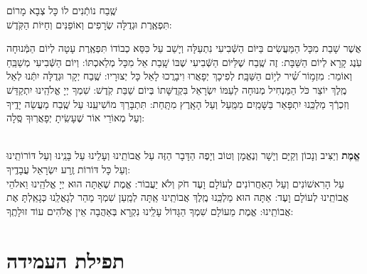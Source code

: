 \documentclass[twoside, openany, parskip=half, 11pt]{book}
\begin{document}
\shatz  שֶֽׁבַח נוֹתְֿנִים לוֹ כָּל צְבָא מָרוֹם \\
תִּפְאֶֽרֶת וּגְדֻלָּה שְׂרָפִים וְאוֹפַנִּים וְחַיּוֹת הַקֹּֽדֶשׁ:

 אֲשֶׁר שָׁבַת מִכָּל הַמַּעֲשִׂים בַּיּוֹם הַשְּֿׁבִיעִי נִתְעַלָּה וְיָשַׁב עַל כִּסֵּא כְבוֹדוֹ תִּפְאֶֽרֶת עָטָה לְיוֹם הַמְּֿנוּחָה עֹֽנֶג קָרָא לְיוֹם הַשַּׁבָּת: זֶה שֶֽׁבַח שֶׁלַּיּוֹם הַשְּֿׁבִיעִי שֶׁבּוֹ שָֽׁבַת אֵל מִכָּל מְלַאכְתּוֹ: וְיוֹם הַשְּֿׁבִיעִי מְשַׁבֵּֽחַ וְאוֹמֵר:
 מִזְמ֥וֹר שִׁ֝֗יר לְי֥וֹם הַשַּׁבָּֽת׃ לְפִיכָךְ יְפָאֲרוּ וִיבָרֲכוּ לָאֵל כָּל יְצוּרָיו: שֶֽׁבַח יְקָר וּגְדֻלָּה יִתְּֿנוּ לְאֵל מֶֽלֶךְ יוֹצֵר כֹּל הַמַּנְחִיל מְנוּחָה לְעַמּוֹ יִשְׂרָאֵל בִּקְדֻשָּׁתוֹ בְּיוֹם שַׁבַּת קֹֽדֶשׁ: שִׁמְךָ יְיָ אֱלֹהֵֽינוּ יִתְקַדַּשׁ וְזִכְרְֿךָ מַלְכֵּֽנוּ יִתְפָּאַר בַּשָּׁמַֽיִם מִמַּֽעַל וְעַל הָאָֽרֶץ מִתָּֽחַת:
  תִּתְבָּרַךְ מוֹשִׁיעֵֽנוּ עַל שֶֽׁבַח מַעֲשֵׂה יָדֶֽיךָ וְעַל מְאוֹרֵי אוֹר שֶׁעָשִֽׂיתָ יְפָאֲרֽוּךָ סֶּֽלָה: 


\label{tisbarach}
\yotzerhameoros

\ahavaraba

\shema

\veahavta

\vehaya

\vayomer

 \smallskip

\begin{paracol}{2}
\\
\textbf{
אֱמֶת
}
 וְיַצִּיב וְנָכוֹן וְקַיָּם וְיָשָׁר וְנֶאֱמָן וְטוֹב וְיָפֶה הַדָּבָר הַזֶּה עַל אֲבוֹתֵֽינוּ וְעָלֵינוּ עַל בָּנֵֽינוּ וְעַל דּוֹרוֹתֵֽינוּ וְעַל כָּל דּוֹרוֹת זֶֽרַע יִשְׂרָאֵל עֲבָדֶֽיךָ:\\
 עַל הָרִאשׁוֹנִים וְעַל הָאַחֲרוֹנִים לְעוֹלָם וָעֶד חֹק וְלֹא יַעֲבוֹר: אֱמֶת שֶׁאַתָּה הוּא יְיָ אֱלֹהֵֽינוּ וֵאלֹהֵי אֲבוֹתֵֽינוּ לְעוֹלָם וָעֶד: אַתָּה הוּא מַלְכֵּֽנוּ מֶֽלֶךְ אֲבוֹתֵֽינוּ אַֽתָּה לְמַֽעַן שִׁמְךָ מַהֵר לְגָאֳלֵֽנוּ כְּגָאַֽלְתָּ אֶת אֲבוֹתֵֽינוּ: אֱמֶת מֵעוֹלָם שִׁמְךָ הַגָּדוֹל עָלֵֽינוּ נִקְרָא בְּאַהֲבָה אֵין אֱלֹהִים עוֹד זוּלָתֶֽךָ:
 	
\switchcolumn

\emesveyatziv

\end{paracol} 
 
\ezrasavoseinu

  \pageref{tefilasregel}


\section[תפילת העמידה]{ תפילת העמידה }
\end{document}
